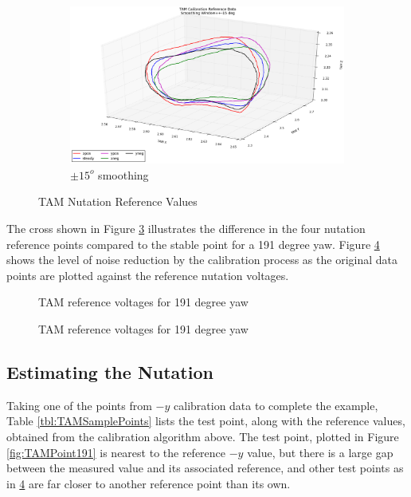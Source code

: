 \begin{figure}[H]
  \begin{subfigure}[h!]{0.8\textwidth}
    \includegraphics[width=\textwidth]{figures/tam_calibration_ref_15deg_smoothing.eps}
    \caption{$\pm 15^o$ smoothing}
    \label{fig:TAM15degCalibration}
  \end{subfigure}
  \caption{TAM Nutation Reference Values}
  \label{fig:TAMNutationReference}
\end{figure}

The cross shown in Figure \ref{fig:TAMRef191} illustrates the difference in the four nutation reference points compared to the stable point for a 191 degree yaw.  Figure \ref{fig:TAMPoints191} shows the level of noise reduction by the calibration process as the original data points are plotted against the reference nutation voltages.

\begin{figure}[H]
  \centerline{}
  \caption{TAM reference voltages for 191 degree yaw}
  \label{fig:TAMRef191}
\end{figure}

\begin{figure}[H]
  \centerline{}
  \caption{TAM reference voltages for 191 degree yaw}
  \label{fig:TAMPoints191}
\end{figure}

\subsection{Estimating the Nutation}

Taking one of the points from $-y$ calibration data to complete the example, Table \ref{tbl:TAMSamplePoints} lists the test point, along with the reference values, obtained from the calibration algorithm above.  The test point, plotted in Figure \ref{fig:TAMPoint191} is nearest to the reference $-y$ value, but there is a large gap between the measured value and its associated reference, and other test points as in \ref{fig:TAMPoints191} are far closer to another reference point than its own.

